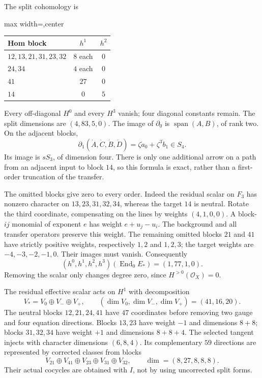 \documentclass[11pt]{amsart}
\theoremstyle{definition}
\theoremstyle{remark}
\newcommand{\cO}{\mathcal O}
\newcommand{\End}{\operatorname{End}}
\begin{document}
The split cohomology is
\begin{center}
\begin{adjustbox}{max width=\textwidth,center}
\begin{tabular}{lcc}
\toprule
Hom block & $h^1$ & $h^2$\\
\midrule
$12,13,21,31,23,32$ & $8$ each & $0$\\
$24,34$ & $4$ each & $0$\\
$41$ & $27$ & $0$\\
$14$ & $0$ & $5$\\
\bottomrule
\end{tabular}
\end{adjustbox}
\end{center}
Every off-diagonal $H^0$ and every $H^3$ vanish; four diagonal
constants remain. The split dimensions are $(4,83,5,0)$.
The image of $\partial_0$ is $\operatorname{span}(A,B)$, of rank two.
On the adjacent blocks,
\begin{equation}\label{eq:endpoint-differential}
 \partial_1(\dot A,\dot C,\dot B,\dot D)
       =\zeta\dot a_0+\zeta^3\dot b_1\in S_4.
\end{equation}
Its image is $sS_3$, of dimension four. There is only one additional
arrow on a path from an adjacent input to block $14$, so this formula
is exact, rather than a first-order truncation of the transfer.

The omitted blocks give zero to every order. Indeed the residual scalar
on $F_3$ has nonzero character on $13,23,31,32,34$, whereas the target
$14$ is neutral. Rotate the third coordinate, compensating on the lines
by weights $(4,1,0,0)$. A block-$ij$ monomial of exponent $e$ has
weight $e+u_j-u_i$. The background and all transfer operators preserve
this weight. The remaining omitted blocks $21$ and $41$ have strictly
positive weights, respectively $1,2$ and $1,2,3$; the target weights
are $-4,-3,-2,-1,0$. Their images must vanish.
Consequently
\begin{equation}\label{eq:endpoint-cohomology}
 (h^0,h^1,h^2,h^3)(\End_0E_*)=(1,77,1,0).
\end{equation}
Removing the scalar only changes degree zero, since $H^{>0}(\cO_X)=0$.

The residual effective scalar acts on $H^1$ with decomposition
\begin{equation}\label{eq:character-decomposition}
 V_*=V_0\oplus V_-\oplus V_+,\qquad
 (\dim V_0,\dim V_-,\dim V_+)=(41,16,20).
\end{equation}
The neutral blocks $12,21,24,41$ have $47$ coordinates before removing
two gauge and four equation directions. Blocks $13,23$ have weight
$-1$ and dimensions $8+8$; blocks $31,32,34$ have weight $+1$ and
dimensions $8+8+4$.
The selected tangent injects with character dimensions $(6,8,4)$.
Its complementary $59$ directions are represented by corrected classes
from blocks
\begin{equation}\label{eq:omitted-directions}
 V_{21}\oplus V_{41}\oplus V_{23}\oplus V_{31}\oplus V_{32},
 \qquad\dim=(8,27,8,8,8).
\end{equation}
Their actual cocycles are obtained with $I$, not by using uncorrected
split forms.
\end{document}
